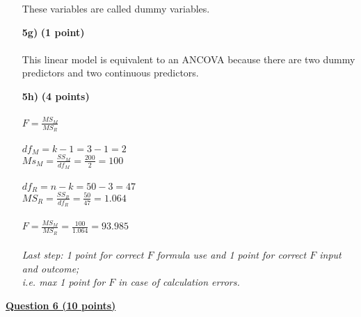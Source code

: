 \begin{itemize}
These variables are called dummy variables. \\
\item[\textbf{5g)}] \textbf{(1 point)} \\ \\
This linear model is equivalent to an ANCOVA because there are two dummy predictors and two continuous predictors. \\
\item[\textbf{5h)}] \textbf{(4 points)} \\ \\
$F = \frac{MS_M}{MS_R}$ \\ \\
$df_M = k-1=3-1=2$ \\
$Ms_M = \frac{SS_M}{df_M} = \frac{200}{2} = 100$ \\ \\
$df_R = n - k = 50 - 3 = 47$ \\
$MS_R = \frac{SS_R}{df_R} = \frac{50}{47} = 1.064$ \\ \\ 
$F = \frac{MS_M}{MS_R} = \frac{100}{1.064} = 93.985$ \\ \\
\textit{Last step: 1 point for correct $F$ formula use and 1 point for correct $F$ input and outcome; \\i.e. max 1 point for $F$ in case of calculation errors.} \\
\end{itemize}

\underline{\textbf{Question 6 (10 points)}} \\

